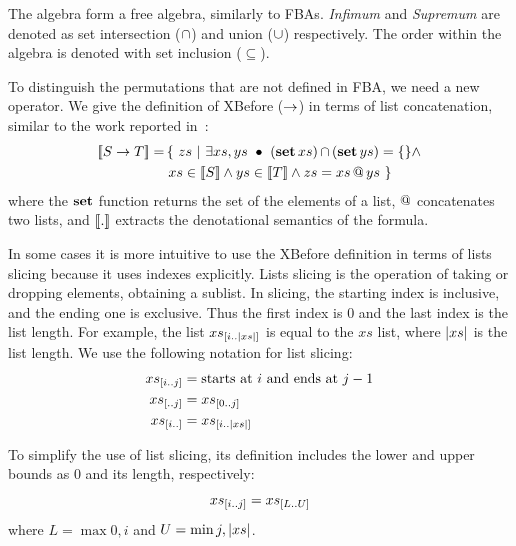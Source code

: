 \documentclass[12pt,openright,twoside,a4paper,oldfontcommands,english,brazil,final]{abntex2}
\makeatletter
\theoremstyle{theo}
\newcommand{\sliceright}[2]{\ensuremath #1_{\left[..#2\right]}}
\newcommand{\sliceleft}[2]{\ensuremath #1_{\left[#2..\right]}}
\newcommand{\slice}[3]{\ensuremath #1_{\left[#2..#3\right]}}
\def\xbeforeop{\ensuremath\rightarrow}
\newcommand{\xbefore}[2]{\ensuremath #1 \xbeforeop #2 }
\newcommand{\length}[1]{\ensuremath\left|#1\right|}
\newcommand{\append}[2]{\ensuremath #1 \operatorname{\mathbf{@}} #2}
\def\listsetop{\ensuremath\operatorname{\mathbf{set}}}
\newcommand{\listset}[1]{\ensuremath\listsetop #1}
\newcommand{\parsin}[1]{\ensuremath\left( #1 \right)}
\def\union{\ensuremath\operatorname{\cup}}
\def\inter{\ensuremath\operatorname{\cap}}
\newcommand{\denote}[1]{\ensuremath\left[\!\left[#1\right]\!\right]}
\makeatother
\begin{document}
The \ac{algebra} form a free algebra, similarly to \acp{FBA}.
\emph{Infimum} and \emph{Supremum} are denoted as set intersection ($\inter$) and union ($\union$) respectively.
The order within the algebra is denoted with set inclusion ($\subseteq$).

To distinguish the permutations that are not defined in \ac{FBA}, we need a new operator.
We give the definition of \ac{XBefore} ($\xbeforeop$) in terms of list concatenation, similar to the work reported in~\cite{DM2015}:
%
\begin{align}
\denote{\xbefore{S}{T}} = &
  \left\{~
    zs ~\middle|~ \exists xs, ys ~\bullet~ \parsin{\listset{xs}} \inter \parsin{\listset{ys}} = \{\} \land \right.\nonumber\\
  & \left. xs \in \denote{S} \land ys \in \denote{T} \land zs = \append{xs}{ys}
  ~\right\}\label{def:xbefore-append}
\end{align}
%
where the $\listset{}$ function returns the set of the elements of a list, $\append{}{}$ concatenates two lists, and $\denote{.}$ extracts the denotational semantics of the formula.

In some cases it is more intuitive to use the \ac{XBefore} definition in terms of lists slicing because it uses indexes explicitly.
Lists slicing is the operation of taking or dropping elements, obtaining a sublist.
In slicing, the starting index is inclusive, and the ending one is exclusive.
Thus the first index is 0 and the last index is the list length.
For example, the list $\slice{xs}{i}{\length{xs}}$ is equal to the $xs$ list, where $\length{xs}$ is the list length.
We use the following notation for list slicing:
%
\begin{subequations}
\begin{align}
\slice{xs}{i}{j} &= \text{starts at $i$ and ends at $j-1$}\label{def:slice}\\
\sliceright{xs}{j} &= \slice{xs}{0}{j}\label{def:slice-right}\\
\sliceleft{xs}{i} &= \slice{xs}{i}{\length{xs}}\label{def:slice-left}
\end{align}
\end{subequations}

To simplify the use of list slicing, its definition includes the lower and upper bounds as $0$ and its length, respectively:
%
\begin{equation}
\slice{xs}{i}{j} = \slice{xs}{L}{U}
\end{equation}
%
where $L = \max{0,i}$ and $U = \min{j,\length{xs}}$.
\end{document}
